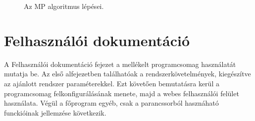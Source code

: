 \documentclass[oneside,titlepage,12pt,a4paper]{report}
\begin{document}
\begin{figure}[htb!]
\caption{Az MP algoritmus lépései.}
\label{fig:mpstep}
\end{figure}


\chapter{Felhasználói dokumentáció}

A Felhasználói dokumentáció fejezet a mellékelt programcsomag használatát mutatja be. Az első alfejezetben találhatóak a rendszerkövetelmények, kiegészítve az ajánlott rendszer paraméterekkel. Ezt követően bemutatásra kerül a programcsomag felkonfigurálásának menete, majd a webes felhasználói felület használata. Végül a főprogram egyéb, csak a parancssorból hasznáható funckióinak jellemzése következik.
\end{document}
